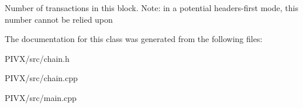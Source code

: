 Number of transactions in this block. Note\+: in a potential headers-\/first mode, this number cannot be relied upon 

The documentation for this class was generated from the following files\+:\begin{DoxyCompactItemize}
\item 
P\+I\+V\+X/src/chain.\+h\item 
P\+I\+V\+X/src/chain.\+cpp\item 
P\+I\+V\+X/src/main.\+cpp\end{DoxyCompactItemize}
